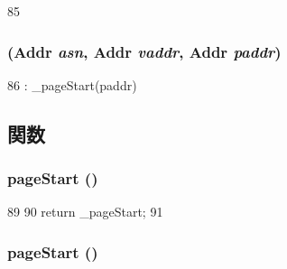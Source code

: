 \begin{DoxyCode}
85 {}
\end{DoxyCode}
\hypertarget{structMipsISA_1_1TlbEntry_a69a4824fbe38adbd1517dda05272617d}{
\subsubsection[{TlbEntry}]{ ({\bf Addr} {\em asn}, \/  {\bf Addr} {\em vaddr}, \/  {\bf Addr} {\em paddr})}}
\label{structMipsISA_1_1TlbEntry_a69a4824fbe38adbd1517dda05272617d}



\begin{DoxyCode}
86 : _pageStart(paddr) {}
\end{DoxyCode}


\subsection{関数}
\hypertarget{structMipsISA_1_1TlbEntry_a4f87fae41ff4bd27577a41dba3cf2b90}{
\subsubsection[{pageStart}]{ pageStart ()}}
\label{structMipsISA_1_1TlbEntry_a4f87fae41ff4bd27577a41dba3cf2b90}



\begin{DoxyCode}
89     {
90         return _pageStart;
91     }
\end{DoxyCode}
\hypertarget{structMipsISA_1_1TlbEntry_a4f87fae41ff4bd27577a41dba3cf2b90}{
\subsubsection[{pageStart}]{ pageStart ()}}
\label{structMipsISA_1_1TlbEntry_a4f87fae41ff4bd27577a41dba3cf2b90}




